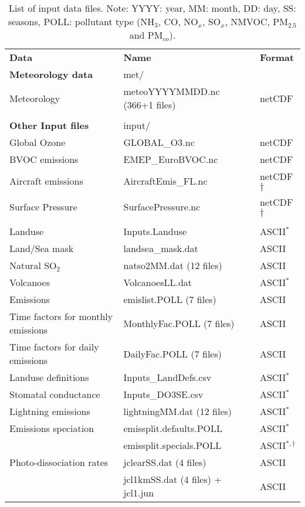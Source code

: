 \begin{table}
\caption[List of input data files]{List of input data files.
Note: YYYY: year, MM: month, DD: day, SS: seasons, POLL: pollutant
type (NH$_3$, CO, NO$_x$, SO$_x$, NMVOC,
PM$_{2.5}$ and PM$_{co}$). 
\label{Tab:inputdata}}
\begin{center}
\begin{small}
\begin{tabular}{lll}
\hline
{\bf Data} &  {\bf Name} & {\bf Format}\\
{\bf Meteorology data} & met/&  \\
Meteorology  &  meteoYYYYMMDD.nc \quad (366+1 files) & netCDF\\
& & \\
{\bf Other Input files} & input/ &\\
Global Ozone & GLOBAL\_O3.nc & netCDF\\
BVOC emissions & EMEP\_EuroBVOC.nc & netCDF\\
Aircraft emissions & AircraftEmis\_FL.nc & netCDF$\dagger$ \\
Surface Pressure & SurfacePressure.nc & netCDF$\dagger$ \\
& & \\
Landuse & Inputs.Landuse & ASCII$^*$\\
Land/Sea mask & landsea\_mask.dat & ASCII\\
Natural SO$_2$ & natso2MM.dat  \quad (12 files) & ASCII\\
Volcanoes & VolcanoesLL.dat & ASCII$^*$\\
Emissions & emislist.POLL  \quad (7 files) & ASCII\\
Time factors for monthly emissions& MonthlyFac.POLL  \quad (7 files) & ASCII\\
Time factors for daily emissions &  DailyFac.POLL  \quad (7 files) & ASCII\\
Landuse definitions & Inputs\_LandDefs.csv & ASCII$^*$\\
Stomatal conductance & Inputs\_DO3SE.csv & ASCII$^*$\\
Lightning emissions & lightningMM.dat  \quad (12 files) & ASCII$^*$\\
Emissions speciation & emissplit.defaults.POLL & ASCII$^*$\\
                     & emissplit.specials.POLL & ASCII$^{*,\dagger}$\\
Photo-dissociation rates & jclearSS.dat \quad (4 files) & ASCII\\
 & jcl1kmSS.dat \quad (4 files) + jcl1.jun & ASCII\\

\end{tabular}
\end{small}
\end{center}
\end{table}
